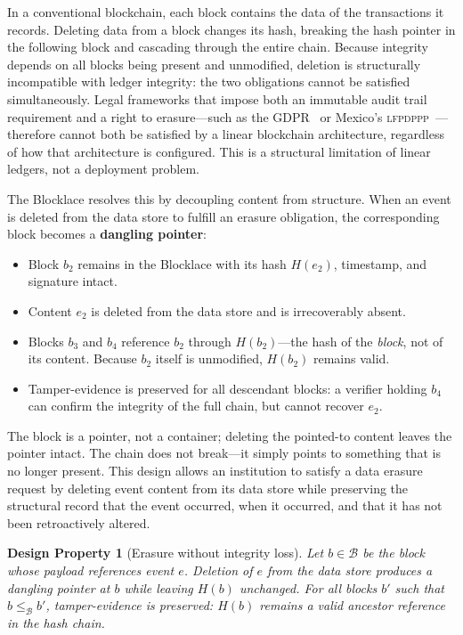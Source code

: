 \documentclass[12pt]{article}
\newtheorem{property}{Design Property}[section]
\newcommand{\Blocklace}{\mathcal{B}}
\begin{document}
	In a conventional blockchain, each block contains the data of the
	transactions it records. Deleting data from a block changes its hash,
	breaking the hash pointer in the following block and cascading through
	the entire chain. Because integrity depends on all blocks being
	present and unmodified, deletion is structurally incompatible with
	ledger integrity: the two obligations cannot be satisfied
	simultaneously. Legal frameworks that impose both an immutable audit
	trail requirement and a right to erasure---such as the
	GDPR~\cite{gdpr2016} or Mexico's
	\textsc{lfpdppp}~\cite{lfpdppp2010}---therefore cannot both be
	satisfied by a linear blockchain architecture, regardless of how that
	architecture is configured. This is a structural limitation of linear
	ledgers, not a deployment problem.
	
	The Blocklace resolves this by decoupling content from structure. When
	an event is deleted from the data store to fulfill an erasure
	obligation, the corresponding block becomes a \textbf{dangling
		pointer}:
	
	\begin{itemize}[itemsep=2pt]
		\item Block $b_2$ remains in the Blocklace with its hash $H(e_2)$,
		timestamp, and signature intact.
		\item Content $e_2$ is deleted from the data store and is
		irrecoverably absent.
		\item Blocks $b_3$ and $b_4$ reference $b_2$ through $H(b_2)$---the
		hash of the \emph{block}, not of its content. Because $b_2$ itself
		is unmodified, $H(b_2)$ remains valid.
		\item Tamper-evidence is preserved for all descendant blocks: a
		verifier holding $b_4$ can confirm the integrity of the full
		chain, but cannot recover $e_2$.
	\end{itemize}
	
	The block is a pointer, not a container; deleting the pointed-to
	content leaves the pointer intact. The chain does not break---it
	simply points to something that is no longer present. This design
	allows an institution to satisfy a data erasure request by deleting
	event content from its data store while preserving the structural
	record that the event occurred, when it occurred, and that it has not
	been retroactively altered.
	
	\begin{property}[Erasure without integrity loss]
		\label{prop:erasure}
		Let $b \in \Blocklace$ be the block whose payload references event
		$e$. Deletion of $e$ from the data store produces a dangling pointer
		at $b$ while leaving $H(b)$ unchanged. For all blocks $b'$ such that
		$b \leq_{\Blocklace} b'$, tamper-evidence is preserved: $H(b)$
		remains a valid ancestor reference in the hash chain.
	\end{property}
	
\end{document}
